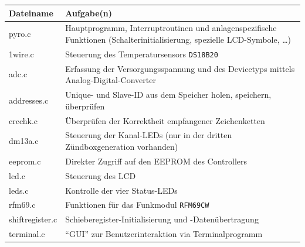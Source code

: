 \documentclass[paper=a4, parskip, numbers=noenddot, toc=listof, headsepline]{scrbook}
\begin{document}
		\begin{table}[h]
			\centering
			\begin{tabular}{lp{125mm}}
				\hline\hline \textbf{Dateiname} & \textbf{Aufgabe(n)}                                                                                                        \\ \hline
				pyro.c                          & Hauptprogramm, Interruptroutinen und anlagenspezifische Funktionen (Schalterinitialisierung, spezielle LCD-Symbole, \dots) \\
				1wire.c                         & Steuerung des Temperatursensors \texttt{DS18B20}                                                                           \\
				adc.c                           & Erfassung der Versorgungsspannung und des Devicetyps mittels Analog-Digital-Converter                                      \\
				addresses.c                     & Unique- und Slave-ID aus dem Speicher holen, speichern, überprüfen                                                         \\
				crcchk.c                        & Überprüfen der Korrektheit empfangener Zeichenketten                                                                       \\
				dm13a.c                         & Steuerung der Kanal-LEDs (nur in der dritten Zündboxgeneration vorhanden)                                                  \\
				eeprom.c                        & Direkter Zugriff auf den EEPROM des Controllers                                                                            \\
				lcd.c                           & Steuerung des LCD                                                                                                          \\
				leds.c                          & Kontrolle der vier Status-LEDs                                                                                             \\
				rfm69.c                         & Funktionen für das Funkmodul \texttt{RFM69CW}                                                                              \\
				shiftregister.c                 & Schieberegister-Initialisierung und -Datenübertragung                                                                      \\
				terminal.c                      & \enquote{GUI} zur Benutzerinteraktion via Terminalprogramm                                                                 \\

\end{tabular}
\end{table}
\end{document}
